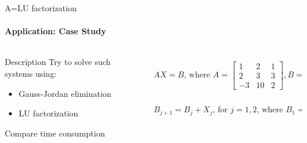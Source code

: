 \documentclass[aspectratio=169,notes]{beamer}
\begin{document}
\begin{frame}[t]{A=LU factorization}
    \framesubtitle{Application: Case Study}
    \vspace{-0.6cm}
    \begin{columns}[T,onlytextwidth]
        \begin{column}{0.49\textwidth}
            \begin{block}{Description}
                Try to solve such systems using:
                \begin{itemize}
                    \item Gauss-Jordan elimination
                    \item LU factorization
                \end{itemize}
                Compare time consumption
            \end{block}
        \end{column}
        \begin{column}{0.49\textwidth}
            \begin{eqnarray*}
                AX=B \text{, where } A = \begin{bmatrix}
                    1  & 2  & 1 \\
                    2  & 3  & 3 \\
                    -3 & 10 & 2
                \end{bmatrix}, B = \begin{bmatrix}
                    k_1 \\k_2\\k_3
                \end{bmatrix} \\
                B_{j+1} = B_j + X_j \text{, for $j=1,2$, where }B_1= \begin{bmatrix}
                    1 \\1\\1
                \end{bmatrix}
            \end{eqnarray*}
        \end{column}
    \end{columns}
    \vspace{-0.8cm}
\end{frame}
\end{document}
